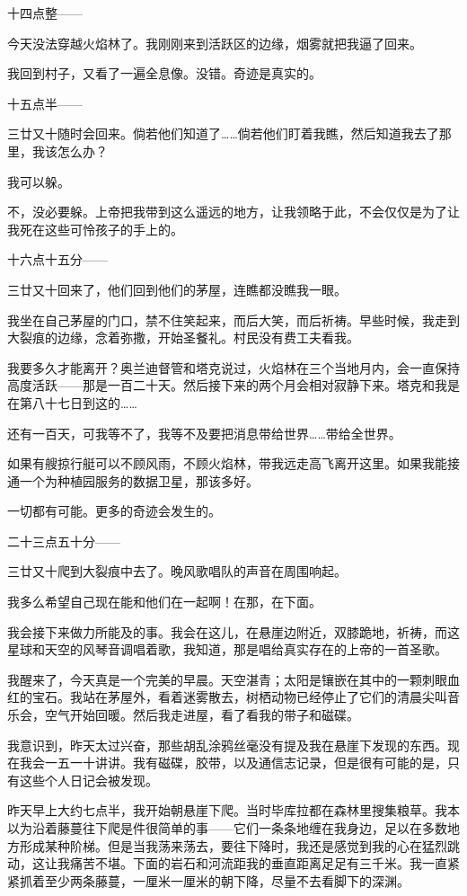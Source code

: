 \documentclass[AutoFakeBold=true]{book}
\begin{document}
十四点整——

今天没法穿越火焰林了。我刚刚来到活跃区的边缘，烟雾就把我逼了回来。

我回到村子，又看了一遍全息像。没错。奇迹是真实的。

十五点半——

三廿又十随时会回来。倘若他们知道了……倘若他们盯着我瞧，然后知道我去了那里，我该怎么办？

我可以躲。

不，没必要躲。上帝把我带到这么遥远的地方，让我领略于此，不会仅仅是为了让我死在这些可怜孩子的手上的。

十六点十五分——

三廿又十回来了，他们回到他们的茅屋，连瞧都没瞧我一眼。

我坐在自己茅屋的门口，禁不住笑起来，而后大笑，而后祈祷。早些时候，我走到大裂痕的边缘，念着弥撒，开始圣餐礼。村民没有费工夫看我。

我要多久才能离开？奥兰迪督管和塔克说过，火焰林在三个当地月内，会一直保持高度活跃——那是一百二十天。然后接下来的两个月会相对寂静下来。塔克和我是在第八十七日到这的……

还有一百天，可我等不了，我等不及要把消息带给世界……带给全世界。

如果有艘掠行艇可以不顾风雨，不顾火焰林，带我远走高飞离开这里。如果我能接通一个为种植园服务的数据卫星，那该多好。

一切都有可能。更多的奇迹会发生的。

二十三点五十分——

三廿又十爬到大裂痕中去了。晚风歌唱队的声音在周围响起。

我多么希望自己现在能和他们在一起啊！在那，在下面。

我会接下来做力所能及的事。我会在这儿，在悬崖边附近，双膝跪地，祈祷，而这星球和天空的风琴音调唱着歌，我知道，那是唱给真实存在的上帝的一首圣歌。

\vspace*{1em}{\kaishu 第一百零六日：}

我醒来了，今天真是一个完美的早晨。天空湛青；太阳是镶嵌在其中的一颗刺眼血红的宝石。我站在茅屋外，看着迷雾散去，树栖动物已经停止了它们的清晨尖叫音乐会，空气开始回暖。然后我走进屋，看了看我的带子和磁碟。

我意识到，昨天太过兴奋，那些胡乱涂鸦丝毫没有提及我在悬崖下发现的东西。现在我会一五一十讲讲。我有磁碟，胶带，以及通信志记录，但是很有可能的是，只有这些个人日记会被发现。

昨天早上大约七点半，我开始朝悬崖下爬。当时毕库拉都在森林里搜集粮草。我本以为沿着藤蔓往下爬是件很简单的事——它们一条条地缠在我身边，足以在多数地方形成某种阶梯。但是当我荡来荡去，要往下降时，我还是感觉到我的心在猛烈跳动，这让我痛苦不堪。下面的岩石和河流距我的垂直距离足足有三千米。我一直紧紧抓着至少两条藤蔓，一厘米一厘米的朝下降，尽量不去看脚下的深渊。
\end{document}
